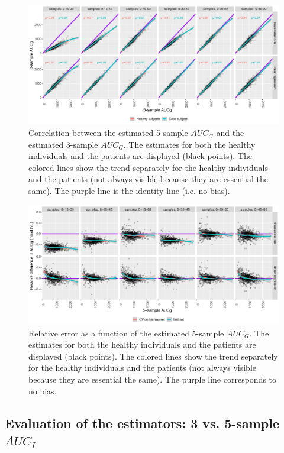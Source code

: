 \documentclass[12pt]{article}
\begin{document}
\begin{figure}[!h]
\centering
\includegraphics[width=1\textwidth]{./figures/AUCg-perf-cor.pdf}
\caption{\label{fig:AUCg-cor-estimator}Correlation between the estimated 5-sample \(AUC_G\) and the estimated 3-sample \(AUC_G\). The estimates for both the healthy individuals and the patients are displayed (black points). The colored lines show the trend separately for the healthy individuals and the patients (not always visible because they are essential the same). The purple line is the identity line (i.e. no bias).}
\end{figure}

\begin{figure}[!h]
\centering
\includegraphics[width=1\textwidth]{./figures/AUCg-perf-blandRelative.pdf}
\caption{\label{fig:AUCg-bland-estimator}Relative error as a function of the estimated 5-sample \(AUC_G\). The estimates for both the healthy individuals and the patients are displayed (black points). The colored lines show the trend separately for the healthy individuals and the patients (not always visible because they are essential the same). The purple line corresponds to no bias.}
\end{figure}

\clearpage

\subsection{Evaluation of the estimators: 3 vs. 5-sample \(AUC_I\)}
\label{sec:orgacffde7}
\end{document}
